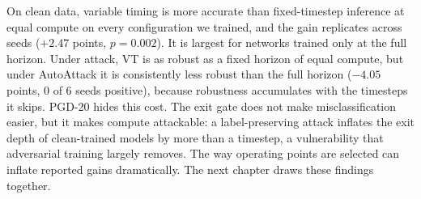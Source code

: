 On clean data, variable timing is more accurate than fixed-timestep inference at equal compute on every configuration we trained, and the gain replicates across seeds ($+2.47$ points, $p = 0.002$). It is largest for networks trained only at the full horizon. Under attack, VT is as robust as a fixed horizon of equal compute, but under AutoAttack it is consistently less robust than the full horizon ($-4.05$ points, 0 of 6 seeds positive), because robustness accumulates with the timesteps it skips. PGD-20 hides this cost. The exit gate does not make misclassification easier, but it makes compute attackable: a label-preserving attack inflates the exit depth of clean-trained models by more than a timestep, a vulnerability that adversarial training largely removes. The way operating points are selected can inflate reported gains dramatically. The next chapter draws these findings together.
